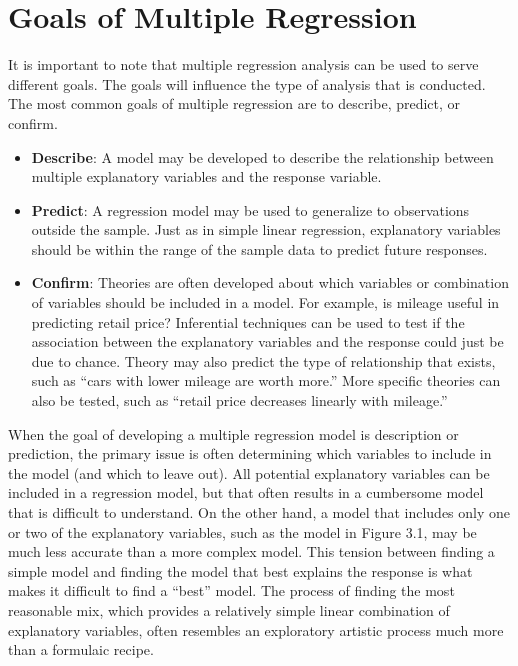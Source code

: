 \documentclass[
]{report}
\providecommand{\tightlist}{%
  \setlength{\itemsep}{0pt}\setlength{\parskip}{0pt}}
\begin{document}
\newpage

\section{\texorpdfstring{\textbf{Goals of Multiple Regression}}{Goals of Multiple Regression}}\label{goals-of-multiple-regression}

It is important to note that multiple regression analysis can be used to serve different goals. The goals will influence the type of analysis that is conducted. The most common goals of multiple regression are to describe, predict, or confirm.

\begin{itemize}
\tightlist
\item
  \textbf{Describe}: A model may be developed to describe the relationship between multiple explanatory variables and the response variable.
\item
  \textbf{Predict}: A regression model may be used to generalize to observations outside the sample. Just as in simple linear regression, explanatory variables should be within the range of the sample data to predict future responses.
\item
  \textbf{Confirm}: Theories are often developed about which variables or combination of variables should be included in a model. For example, is mileage useful in predicting retail price? Inferential techniques can be used to test if the association between the explanatory variables and the response could just be due to chance. Theory may also predict the type of relationship that exists, such as ``cars with lower mileage are worth more.'' More specific theories can also be tested, such as ``retail price decreases linearly with mileage.''
\end{itemize}

When the goal of developing a multiple regression model is description or prediction, the primary issue is often determining which variables to include in the model (and which to leave out). All potential explanatory variables can be included in a regression model, but that often results in a cumbersome model that is difficult to understand. On the other hand, a model that includes only one or two of the explanatory variables, such as the model in Figure 3.1, may be much less accurate than a more complex model. This tension between finding a simple model and finding the model that best explains the response is what makes it difficult to find a ``best'' model. The process of finding the most reasonable mix, which provides a relatively simple linear combination of explanatory variables, often resembles an exploratory artistic process much more than a formulaic recipe.
\end{document}
